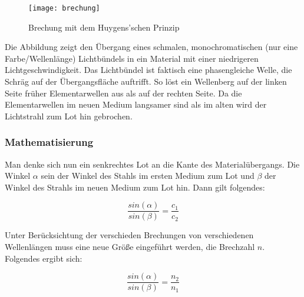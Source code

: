 \begin{figure}[h!]
	\center
	\texttt{[image: brechung]}
	\caption{Brechung mit dem Huygens'schen Prinzip}
\end{figure}

Die Abbildung zeigt den Übergang eines schmalen, monochromatischen (nur eine Farbe/Wellenlänge) Lichtbündels in ein Material mit einer niedrigeren Lichtgeschwindigkeit. Das Lichtbündel ist faktisch eine phasengleiche Welle, die Schräg auf der Übergangsfläche auftrifft. So löst ein Wellenberg auf der linken Seite früher Elementarwellen aus als auf der rechten Seite. Da die Elementarwellen im neuen Medium langsamer sind als im alten wird der Lichtstrahl zum Lot hin gebrochen.

\subsubsection{Mathematisierung}

	Man denke sich nun ein senkrechtes Lot an die Kante des Materialübergangs. Die Winkel $\alpha$ sein der Winkel des Stahls im ersten Medium zum Lot und $\beta$ der Winkel des Strahls im neuen Medium zum Lot hin. Dann gilt folgendes:
	
	\begin{equation}
		\frac{sin{(\alpha)}}{sin{(\beta)}} = \frac{c_1}{c_2}
	\end{equation}
	
	Unter Berücksichtung der verschieden Brechungen von verschiedenen Wellenlängen muss eine neue Größe eingeführt werden, die Brechzahl $n$. Folgendes ergibt sich:
	
	\begin{equation} \label{eq:brechungsgesetz}
		\frac{sin{(\alpha)}}{sin{(\beta)}} = \frac{n_2}{n_1}
	\end{equation}






